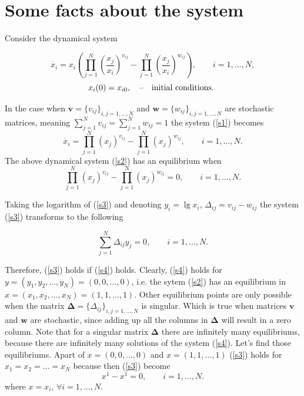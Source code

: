 \documentclass[a4paper,10pt, english]{article}
\newcommand{\D}{\displaystyle}
\begin{document}
\section{Some facts about the system}

Consider the dynamical system 

\begin{equation}
\label{s1}
\D
\dot{x_i} = x_i \left(\prod_{j=1}^{N} \left(\frac{x_j}{x_i}\right)^{v_{ij}} - \prod_{j=1}^{N}\left(\frac{x_j}{x_i}\right)^{w_{ij}} \right), \qquad i=1,\ldots, N,
\end{equation}
$$
x_i(0) = x_{i0}, \quad \mbox{\---} \quad \mbox{initial conditions. }
$$


In the case when $\mathbf{v} = \{v_{ij}\}_{i,j=1, \ldots, N}$ and $\mathbf{w} = \{w_{ij}\}_{i,j=1, \ldots, N}$ are stochastic matrices, meaning $\sum_{j=1}^{N}v_{ij} = \sum_{j=1}^{N}w_{ij} = 1$ the system (\ref{s1}) becomes
\begin{equation}
\label{s2}
\D
\dot{x_i}  = \prod_{j=1}^{N} \left(x_j\right)^{v_{ij}} - \prod_{j=1}^{N}\left(x_j\right)^{w_{ij}} , \qquad i=1,\ldots, N.
\end{equation}
The above dynamical system (\ref{s2}) has an equilibrium when
\begin{equation}
\label{s3}
\D
 \prod_{j=1}^{N} \left(x_j\right)^{v_{ij}} - \prod_{j=1}^{N}\left(x_j\right)^{w_{ij}}  = 0, \qquad i=1,\ldots, N.
\end{equation}

Taking the logarithm of (\ref{s3}) and denoting $y_i = \lg{x_i}$, $\Delta_{ij} = v_{ij} - w_{ij}$ the system (\ref{s3}) transforms to the following

\begin{equation}
\label{s4}
\D
\sum_{j=1}^{N}\Delta_{ij}y_j = 0, \qquad i=1,\ldots, N.
\end{equation}

Therefore, (\ref{s3}) holds if  (\ref{s4}) holds. Clearly, (\ref{s4}) holds for $y=(y_1, y_2, \ldots, y_N) = (0, 0, \ldots, 0)$, i.e. the sytem (\ref{s2}) has an equilibrium in 
$x=(x_1, x_2, \ldots, x_N) = (1, 1, \ldots, 1)$. Other equilibrium points are only possible when the matrix $\mathbf{\Delta} = \{\Delta_{ij}\}_{i,j=1, \ldots, N}$ is singular.
Which is true when matrices $\mathbf{v}$ and $\mathbf{w}$ are stochastic, since adding up all the columns in $\mathbf{\Delta}$ will result in a zero column.
Note that for a singular matrix $\mathbf{\Delta}$ there are infinitely many equilibriums, because there are infinitely many solutions of the system (\ref{s4}). 
Let's find those equilibriums. Apart of  $x = (0, 0, \ldots, 0)$ and $x = (1, 1, \ldots, 1)$ (\ref{s3}) holds for $x_1 =  x_2 = \ldots = x_N$ because then (\ref{s3}) become
$$
\D
 x^1 - x^1 = 0, \qquad i=1,\ldots, N.
$$
where $x = x_i$, $\forall i=1,\ldots, N$.
\end{document}
